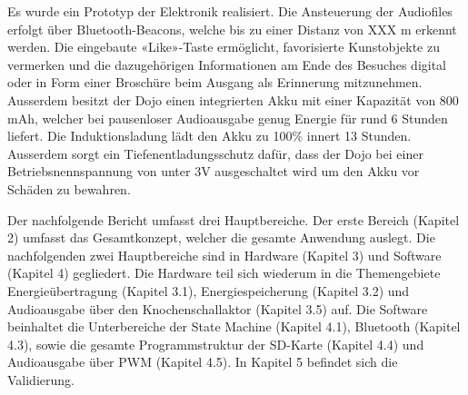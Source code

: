 Es wurde ein Prototyp der Elektronik realisiert. Die Ansteuerung der Audiofiles erfolgt über Bluetooth-Beacons, welche bis zu einer Distanz von XXX m erkennt werden. Die eingebaute «Like»-Taste ermöglicht, favorisierte Kunstobjekte zu vermerken und die dazugehörigen Informationen am Ende des Besuches digital oder in Form einer Broschüre beim Ausgang als Erinnerung mitzunehmen. Ausserdem besitzt der Dojo einen integrierten Akku mit einer Kapazität von 800 mAh, welcher bei pausenloser Audioausgabe genug Energie für rund 6 Stunden liefert. Die Induktionsladung lädt den Akku zu 100\% innert 13 Stunden. Ausserdem sorgt ein Tiefenentladungsschutz dafür, dass der Dojo bei einer Betriebsnennspannung von unter 3V ausgeschaltet wird um den Akku vor Schäden zu bewahren.

Der nachfolgende Bericht umfasst drei Hauptbereiche. Der erste Bereich (Kapitel 2) umfasst das Gesamtkonzept, welcher die gesamte Anwendung auslegt. Die nachfolgenden zwei Hauptbereiche sind in Hardware (Kapitel 3) und Software (Kapitel 4) gegliedert. Die Hardware teil sich wiederum in die Themengebiete Energieübertragung (Kapitel 3.1), Energiespeicherung (Kapitel 3.2) und Audioausgabe über den Knochenschallaktor (Kapitel 3.5) auf. Die Software beinhaltet die Unterbereiche der State Machine (Kapitel 4.1), Bluetooth (Kapitel 4.3), sowie die gesamte Programmstruktur der SD-Karte (Kapitel 4.4) und Audioausgabe über PWM (Kapitel 4.5). In Kapitel 5 befindet sich die Validierung. 
